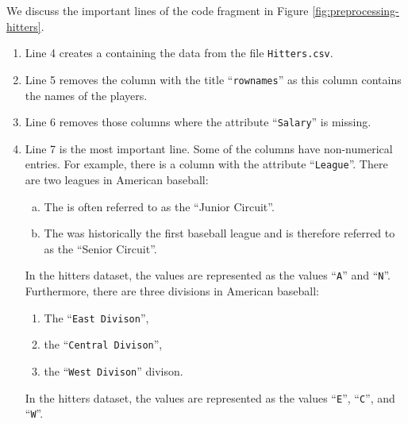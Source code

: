 We discuss the important lines of the code fragment in Figure \ref{fig:preprocessing-hitters}.
\begin{enumerate}
\item Line 4 creates a  containing the data from the file \texttt{Hitters.csv}.
\item Line 5 removes the column with the title ``\texttt{rownames}'' as this column contains the names of the
      players.
\item Line 6 removes those columns where the attribute ``\texttt{Salary}'' is missing.
\item Line 7 is the most important line.  Some of the columns have non-numerical entries.  For example,
      there is a column with the attribute ``\texttt{League}''.  There are two leagues in American baseball:
      \begin{enumerate}[(a)]
      \item The  is often referred to as the ``Junior Circuit''. 
      \item The  was historically the first baseball league and is therefore
            referred to as the ``Senior Circuit''.
      \end{enumerate}
      In the hitters dataset, the values are represented as the values ``\texttt{A}'' and ``\texttt{N}''.
      Furthermore, there are three divisions in American baseball:
      \begin{enumerate}
      \item The ``\texttt{East Divison}'',
      \item the ``\texttt{Central Divison}'',
      \item the ``\texttt{West Divison}'' divison.
      \end{enumerate}
      In the hitters dataset, the values are represented as the values ``\texttt{E}'', ``\texttt{C}'', and ``\texttt{W}''.


\end{enumerate}
